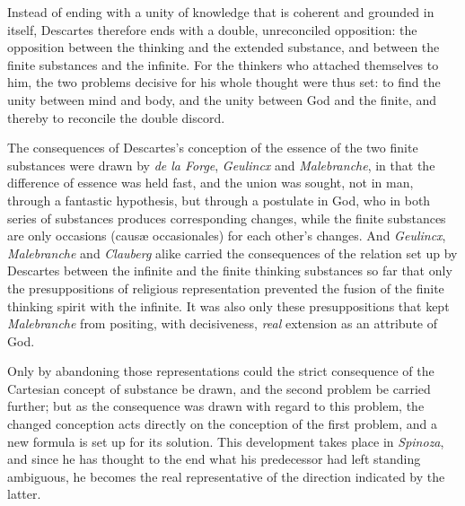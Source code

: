 \documentclass[12pt,a4paper,openany]{book}
\begin{document}
Instead of ending with a unity of knowledge that is coherent and grounded
in itself, Descartes therefore ends with a double, unreconciled
opposition: the opposition between the thinking and the extended
substance, and between the finite substances and the infinite. For the
thinkers who attached themselves to him, the two problems decisive for
his whole thought were thus set: to find the unity between mind and
body, and the unity between God and the finite, and thereby to reconcile
the double discord.

The consequences of Descartes's conception of the essence of the two
finite substances were drawn by \emph{de la Forge}, \emph{Geulincx} and
\emph{Malebranche}, in that the difference of essence was held fast,
and the union was sought, not in man, through a fantastic hypothesis,
but through a postulate in God, who in both series of substances
produces corresponding changes, while the finite substances are only
occasions (causæ occasionales) for each other's changes. And
\emph{Geulincx}, \emph{Malebranche} and \emph{Clauberg} alike carried
the consequences of the relation set up by Descartes between the
infinite and the finite thinking substances so far that only the
presuppositions of religious representation prevented the fusion of
the finite thinking spirit with the infinite. It was also only these
presuppositions that kept \emph{Malebranche} from positing, with
decisiveness, \emph{real} extension as an attribute of God.

Only by abandoning those representations could the strict consequence
of the Cartesian concept of substance be drawn, and the second problem
be carried further; but as the consequence was drawn with regard to
this problem, the changed conception acts directly on the conception of
the first problem, and a new formula is set up for its solution. This
development takes place in \emph{Spinoza}, and since he has thought to
the end what his predecessor had left standing ambiguous, he becomes the
real representative of the direction indicated by the latter.
\end{document}
